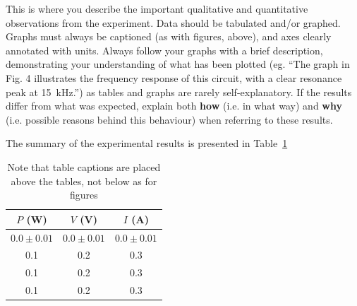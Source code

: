 \documentclass[11pt, a4paper]{article}
\begin{document}
This is where you describe the important qualitative and quantitative observations from the experiment. Data should be tabulated and/or graphed. Graphs must always be captioned (as with figures, above), and axes clearly annotated with units. Always follow your graphs with a brief description, demonstrating your understanding of what has been plotted (eg. ``The graph in Fig. 4 illustrates the frequency response of this circuit, with a clear resonance peak at 15~kHz.'') as tables and graphs are rarely self-explanatory. If the results differ from what was expected, explain both \textbf{how} (i.e. in what way) and \textbf{why} (i.e. possible reasons behind this behaviour) when referring to these results.

%


The summary of the experimental results is presented in Table~\ref{tab:summary}

\begin{table}[htbp]
\caption{Note that table captions are placed above the tables, not below as for figures}
\label{tab:summary}
\begin{center}
\begin{tabular}{ccc}
\hline
 $P$ (W)      & $V$ (V)       & $I$ (A)   \\
\hline
$0.0\pm0.01$ & $0.0\pm0.01$ & $0.0\pm0.01$  \\
 0.1         & 0.2          &  0.3         \\
 0.1         & 0.2          &  0.3         \\
 0.1         & 0.2          &  0.3         \\

\hline
\end{tabular}
\end{center}
\end{table}
\end{document}
